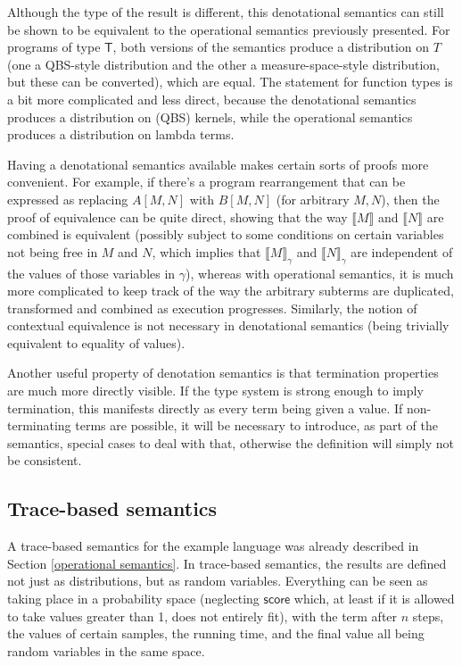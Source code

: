 \documentclass[titlepage]{article}
\newcommand{\tscore}{\mathsf{score}}
\newcommand{\denotation}[1]{\llbracket #1 \rrbracket}
\begin{document}
Although the type of the result is different, this denotational semantics can still be shown to be equivalent to the operational semantics previously presented. For programs of type $\mathsf T$, both versions of the semantics produce a distribution on $T$ (one a QBS-style distribution and the other a measure-space-style distribution, but these can be converted), which are equal. The statement for function types is a bit more complicated and less direct, because the denotational semantics produces a distribution on (QBS) kernels, while the operational semantics produces a distribution on lambda terms.


Having a denotational semantics available makes certain sorts of proofs more convenient. For example, if there's a program rearrangement that can be expressed as replacing $A[M,N]$ with $B[M,N]$ (for arbitrary $M, N$), then the proof of equivalence can be quite direct, showing that the way $\denotation M$ and $\denotation N$ are combined is equivalent (possibly subject to some conditions on certain variables not being free in $M$ and $N$, which implies that $\denotation M_\gamma$ and $\denotation N_\gamma$ are independent of the values of those variables in $\gamma$), whereas with operational semantics, it is much more complicated to keep track of the way the arbitrary subterms are duplicated, transformed and combined as execution progresses. Similarly, the notion of contextual equivalence is not necessary in denotational semantics (being trivially equivalent to equality of values).

Another useful property of denotation semantics is that termination properties are much more directly visible. If the type system is strong enough to imply termination, this manifests directly as every term being given a value. If non-terminating terms are possible, it will be necessary to introduce, as part of the semantics, special cases to deal with that, otherwise the definition will simply not be consistent.

\subsection{Trace-based semantics}
A trace-based semantics for the example language was already described in Section \ref{operational semantics}. In trace-based semantics, the results are defined not just as distributions, but as random variables. Everything can be seen as taking place in a probability space (neglecting $\tscore$ which, at least if it is allowed to take values greater than 1, does not entirely fit), with the term after $n$ steps, the values of certain samples, the running time, and the final value all being random variables in the same space.
\end{document}
